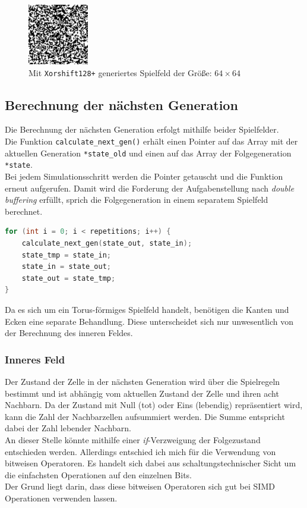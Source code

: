 \documentclass[german,plainarticle,hyperref,utf8]{zihpub}
\begin{document}
	\begin{figure}[h]
		\begin{center}
			\includegraphics[scale=5.0]{initialized_board.pdf}
		\end{center}
		\caption{Mit \texttt{Xorshift128+} generiertes Spielfeld der Größe: $64\times 64$}
	\end{figure}
	
	\subsection{Berechnung der nächsten Generation}
	Die Berechnung der nächsten Generation erfolgt mithilfe beider Spielfelder.\\ Die Funktion \texttt{calculate\_next\_gen()} erhält einen Pointer auf das Array mit der aktuellen Generation \texttt{*state\_old} und einen auf das Array der Folgegeneration \texttt{*state}.\\
	Bei jedem Simulationsschritt werden die Pointer getauscht und die Funktion erneut aufgerufen. Damit wird die Forderung der Aufgabenstellung nach \textit{double buffering} erfüllt, sprich die Folgegeneration in einem separatem Spielfeld berechnet.
	\begin{lstlisting}[language=C, caption=Vertauschen der Pointer vor jedem Funktionsaufruf (vereinfacht)]
for (int i = 0; i < repetitions; i++) {
	calculate_next_gen(state_out, state_in);
	state_tmp = state_in;
	state_in = state_out;
	state_out = state_tmp;
}\end{lstlisting}
	Da es sich um ein Torus-förmiges Spielfeld handelt, benötigen die Kanten und Ecken eine separate Behandlung. Diese unterscheidet sich nur unwesentlich von der Berechnung des inneren Feldes.
	
	\subsubsection{Inneres Feld}
	Der Zustand der Zelle in der nächsten Generation wird über die Spielregeln bestimmt und ist abhängig vom aktuellen Zustand der Zelle und ihren acht Nachbarn. Da der Zustand mit Null (tot) oder Eins (lebendig) repräsentiert wird, kann die Zahl der Nachbarzellen aufsummiert werden. Die Summe entspricht dabei der Zahl lebender Nachbarn.\\
	An dieser Stelle könnte mithilfe einer \textit{if}-Verzweigung der Folgezustand entschieden werden. Allerdings entschied ich mich für die Verwendung von bitweisen Operatoren. Es handelt sich dabei aus schaltungstechnischer Sicht um die einfachsten Operationen auf den einzelnen Bits.\\
	Der Grund liegt darin, dass diese bitweisen Operatoren sich gut bei SIMD Operationen verwenden lassen.\\
	
\end{document}

